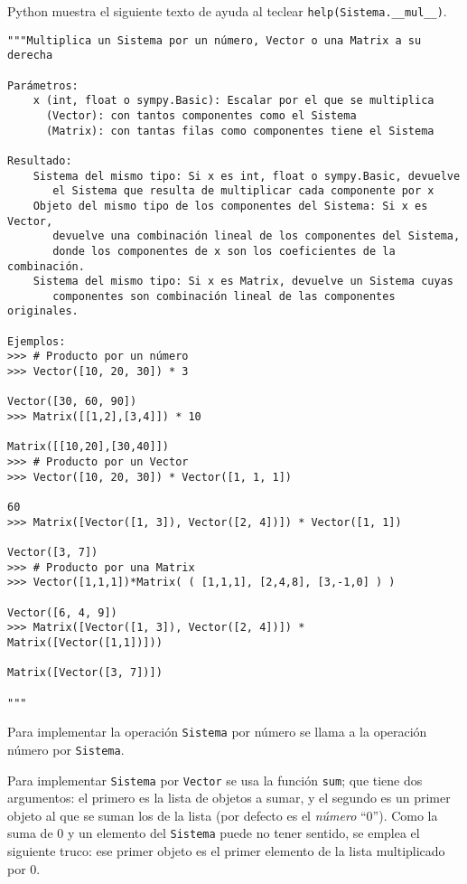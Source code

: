 \documentclass[11pt]{report}
\begin{document}
Python muestra el siguiente texto de ayuda al teclear
\texttt{help(Sistema.\_\_mul\_\_)}.
\begin{verbatim}
"""Multiplica un Sistema por un número, Vector o una Matrix a su derecha

Parámetros:
    x (int, float o sympy.Basic): Escalar por el que se multiplica
      (Vector): con tantos componentes como el Sistema
      (Matrix): con tantas filas como componentes tiene el Sistema

Resultado:
    Sistema del mismo tipo: Si x es int, float o sympy.Basic, devuelve 
       el Sistema que resulta de multiplicar cada componente por x
    Objeto del mismo tipo de los componentes del Sistema: Si x es Vector,
       devuelve una combinación lineal de los componentes del Sistema, 
       donde los componentes de x son los coeficientes de la combinación.
    Sistema del mismo tipo: Si x es Matrix, devuelve un Sistema cuyas 
       componentes son combinación lineal de las componentes originales.
       
Ejemplos:
>>> # Producto por un número
>>> Vector([10, 20, 30]) * 3

Vector([30, 60, 90])
>>> Matrix([[1,2],[3,4]]) * 10

Matrix([[10,20],[30,40]])
>>> # Producto por un Vector
>>> Vector([10, 20, 30]) * Vector([1, 1, 1])

60
>>> Matrix([Vector([1, 3]), Vector([2, 4])]) * Vector([1, 1])

Vector([3, 7])
>>> # Producto por una Matrix
>>> Vector([1,1,1])*Matrix( ( [1,1,1], [2,4,8], [3,-1,0] ) )

Vector([6, 4, 9])
>>> Matrix([Vector([1, 3]), Vector([2, 4])]) * Matrix([Vector([1,1])]))

Matrix([Vector([3, 7])])

"""
\end{verbatim}

Para implementar la operación \texttt{Sistema} por número se llama a la
operación número por \texttt{Sistema}.

Para implementar \texttt{Sistema} por \texttt{Vector} se usa la función \texttt{sum}; que
tiene dos argumentos: el primero es la lista de objetos a sumar, y el
segundo es un primer objeto al que se suman los de la lista (por
defecto es el \emph{número} ``\(0\)''). Como la suma de \(0\) y un
elemento del \texttt{Sistema} puede no tener sentido, se emplea el siguiente
truco: ese primer objeto es el primer elemento de la lista
multiplicado por \(0\).
\end{document}
